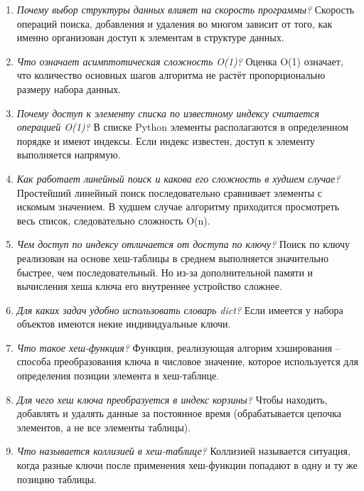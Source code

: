 \begin{enumerate}
	\item \textit{Почему выбор структуры данных влияет на скорость программы?}\newline
	Скорость операций поиска, добавления и удаления во многом зависит от того, как именно организован доступ к элементам в структуре данных.
	\item \textit{Что означает асимптотическая сложность O(1)?}\newline
	Оценка O(1) означает, что количество основных шагов алгоритма не растёт пропорционально размеру набора данных.
	\item \textit{Почему доступ к элементу списка по известному индексу считается операцией O(1)?}\newline
	В списке Python элементы располагаются в определенном порядке и имеют индексы. Если индекс известен, доступ к элементу выполняется напрямую.
	\item \textit{Как работает линейный поиск и какова его сложность в худшем случае?}\newline
	Простейший линейный поиск последовательно сравнивает элементы с искомым значением. В худшем случае алгоритму приходится просмотреть весь список, следовательно сложность O(n).
	\item \textit{Чем доступ по индексу отличается от доступа по ключу?}\newline
	Поиск по ключу реализован на основе хеш-таблицы в среднем выполняется значительно быстрее, чем последовательный. Но из-за дополнительной памяти и вычисления хеша ключа его внутреннее устройство сложнее.
	\item \textit{Для каких задач удобно использовать словарь dict?}\newline
	Если имеется у набора объектов имеются некие индивидуальные ключи.
	\item \textit{Что такое хеш-функция?}\newline
	Функция, реализующая алгорим хэширования -- способа преобразования ключа в числовое значение, которое используется для определения позиции элемента в хеш-таблице.
	\item \textit{Для чего хеш ключа преобразуется в индекс корзины?}\newline
	Чтобы находить, добавлять и удалять данные за постоянное время (обрабатывается цепочка элементов, а не все элементы таблицы). 
	\item \textit{Что называется коллизией в хеш-таблице?}\newline
	Коллизией называется ситуация, когда разные ключи после применения хеш-функции попадают в одну и ту же позицию таблицы.

\end{enumerate}
